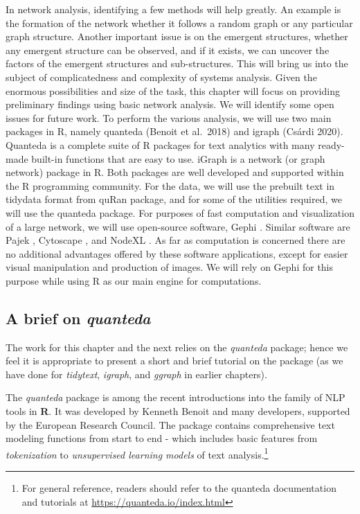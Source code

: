 \documentclass[
]{article}
\begin{document}
In network analysis, identifying a few methods will help greatly. An example is the formation of the network whether it follows a random graph or any particular graph structure. Another important issue is on the emergent structures, whether any emergent structure can be observed, and if it exists, we can uncover the factors of the emergent structures and sub-structures. This will bring us into the subject of complicatedness and complexity of systems analysis.
Given the enormous possibilities and size of the task, this chapter will focus on providing preliminary findings using basic network analysis. We will identify some open issues for future work.
To perform the various analysis, we will use two main packages in R, namely quanteda (Benoit et al.~2018) and igraph (Csárdi 2020). Quanteda is a complete suite of R packages for text analytics with many ready-made built-in functions that are easy to use. iGraph is a network (or graph network) package in R. Both packages are well developed and supported within the R programming community. For the data, we will use the prebuilt text in tidydata format from quRan package, and for some of the utilities required, we will use the quanteda package.
For purposes of fast computation and visualization of a large network, we will use open-source software, Gephi . Similar software are Pajek , Cytoscape , and NodeXL . As far as computation is concerned there are no additional advantages offered by these software applications, except for easier visual manipulation and production of images. We will rely on Gephi for this purpose while using R as our main engine for computations.

\hypertarget{a-brief-tutorial-on-quanteda}{%
\subsection{\texorpdfstring{A brief on \emph{quanteda}}{A brief on quanteda}}\label{a-brief-tutorial-on-quanteda}}

The work for this chapter and the next relies on the \emph{quanteda} package; hence we feel it is appropriate to present a short and brief tutorial on the package (as we have done for \emph{tidytext}, \emph{igraph}, and \emph{ggraph} in earlier chapters).

The \emph{quanteda} package is among the recent introductions into the family of NLP tools in \textbf{R}. It was developed by Kenneth Benoit and many developers, supported by the European Research Council\citep{quanteda}. The package contains comprehensive text modeling functions from start to end - which includes basic features from \emph{tokenization} to \emph{unsupervised learning models} of text analysis.\footnote{For general reference, readers should refer to the quanteda documentation and tutorials at \url{https://quanteda.io/index.html}}
\end{document}
